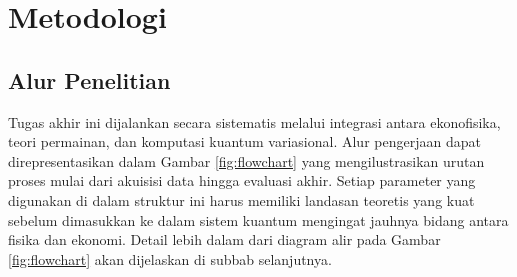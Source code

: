 \chapter{Metodologi}

\section{Alur Penelitian}
Tugas akhir ini dijalankan secara sistematis melalui integrasi antara ekonofisika, teori permainan, dan komputasi kuantum variasional. Alur pengerjaan dapat direpresentasikan dalam Gambar \ref{fig:flowchart} yang mengilustrasikan urutan proses mulai dari akuisisi data hingga evaluasi akhir. Setiap parameter yang digunakan di dalam struktur ini harus memiliki landasan teoretis yang kuat sebelum dimasukkan ke dalam sistem kuantum mengingat jauhnya bidang antara fisika dan ekonomi. Detail lebih dalam dari diagram alir pada Gambar \ref{fig:flowchart} akan dijelaskan di subbab selanjutnya.

